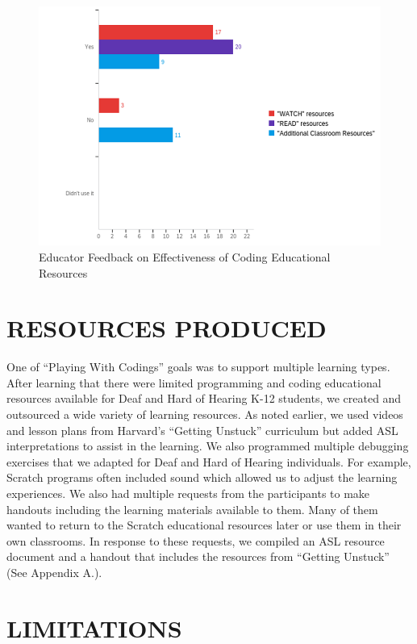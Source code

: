 \documentclass[11.5pt]{sig-alternate} %
\begin{document}
\begin{large}
\begin{figure}[th]
    \includegraphics[width=\linewidth]{images/fig4.png}
    \caption{Educator Feedback on Effectiveness of Coding Educational Resources}
    \label{Figure 4}
\end{figure}

\section*{RESOURCES PRODUCED}

One of “Playing With Codings” goals was to support multiple learning types. After learning that there were limited programming and coding educational resources available for Deaf and Hard of Hearing K-12 students, we created and outsourced a wide variety of learning resources. As noted earlier, we used videos and lesson plans from Harvard’s “Getting Unstuck” curriculum but added ASL interpretations to assist in the learning. We also programmed multiple debugging exercises that we adapted for Deaf and Hard of Hearing individuals. For example,  Scratch programs often included sound which allowed us to adjust the learning experiences. We also had multiple requests from the participants to make handouts including the learning materials available to them. Many of them wanted to return to the Scratch educational resources later or use them in their own classrooms. In response to these requests, we compiled an ASL resource document and a handout that includes the resources from “Getting Unstuck” (See Appendix A.).

\section*{LIMITATIONS}


\end{large}
\end{document}
